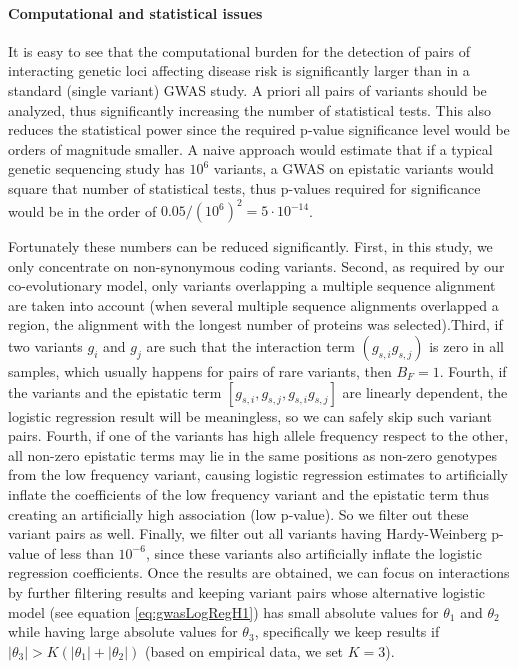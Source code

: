 \paragraph{Computational and statistical issues} It is easy to see that the computational burden for the detection of pairs of interacting genetic loci affecting disease risk is significantly larger than in a standard (single variant) GWAS study. A priori all pairs of variants should be analyzed, thus significantly increasing the number of statistical tests. This also reduces the statistical power since the required p-value significance level would be orders of magnitude smaller. A na\:ive approach would estimate that if a typical genetic sequencing study has $10^6$ variants, a GWAS on epistatic variants would square that number of statistical tests, thus p-values required for significance would be in the order of $0.05 / (10^6)^2 = 5 \cdot 10^{-14}$. 

Fortunately these numbers can be reduced significantly. First, in this study, we only concentrate on non-synonymous coding variants. Second, as required by our co-evolutionary model, only variants overlapping a multiple sequence alignment are taken into account (when several multiple sequence alignments overlapped a region, the alignment with the longest number of proteins was selected).Third, if two variants $g_i$ and $g_j$ are such that the interaction term $(g_{s,i} g_{s,j})$ is zero in all samples, which usually happens for pairs of rare variants, then $B_F = 1$. Fourth, if the variants and the epistatic term $[g_{s,i}, g_{s,j}, g_{s,i} g_{s,j}]$ are linearly dependent, the logistic regression result will be meaningless, so we can safely skip such variant pairs. Fourth, if one of the variants has high allele frequency respect to the other, all non-zero epistatic terms may lie in the same positions as non-zero genotypes from the low frequency variant, causing logistic regression estimates to artificially inflate the coefficients of the low frequency variant and the epistatic term thus creating an artificially high association (low p-value). So we filter out these variant pairs as well. Finally, we filter out all variants having Hardy-Weinberg p-value of less than $10^{-6}$, since these variants also artificially inflate the logistic regression coefficients.  Once the results are obtained, we can focus on interactions by further filtering results and keeping variant pairs whose alternative logistic model (see equation \ref{eq:gwasLogRegH1}) has small absolute values for $\theta_1$ and $\theta_2$ while having large absolute values for $\theta_3$, specifically we keep results if $|\theta_3| > K ( |\theta_1| + |\theta_2| )$ (based on empirical data, we set $K=3$). 

